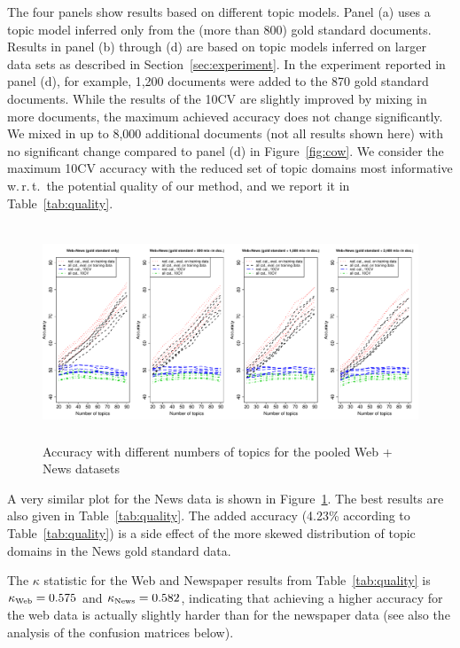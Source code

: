 \documentclass[11pt]{article}
\begin{document}
The four panels show results based on different topic models.
Panel (a) uses a topic model inferred only from the (more than 800) gold standard documents.
Results in panel (b) through (d) are based on topic models inferred on larger data sets as described in Section~\ref{sec:experiment}.
In the experiment reported in panel (d), for example, 1,200 documents were added to the 870 gold standard documents.
While the results of the 10CV are slightly improved by mixing in more documents, the maximum achieved accuracy does not change significantly.
We mixed in up to 8,000 additional documents (not all results shown here) with no significant change compared to panel (d) in Figure~\ref{fig:cow}.
We consider the maximum 10CV accuracy with the reduced set of topic domains most informative w.\,r.\,t.\ the potential quality of our method, and we report it in Table~\ref{tab:quality}.

\begin{figure}[!ht]
  \centering
  \includegraphics[width=\textwidth, height=6.4cm]{graphics/coreko.pdf}
  \caption{Accuracy with different numbers of topics for the pooled Web + News datasets}
  \label{fig:coreko}
\end{figure}

A very similar plot for the News data is shown in Figure~\ref{fig:coreko}.
The best results are also given in Table~\ref{tab:quality}.
The added accuracy (4.23\% according to Table~\ref{tab:quality}) is a side effect of the more skewed distribution of topic domains in the News gold standard data.

The $\kappa$ statistic for the Web and Newspaper results from Table~\ref{tab:quality} is $\kappa_{\textrm{\tiny Web}}=0.575$ and $\kappa_{\textrm{\tiny News}}=0.582$, indicating that achieving a higher accuracy for the web data is actually slightly harder than for the newspaper data (see also the analysis of the confusion matrices below).
\end{document}
